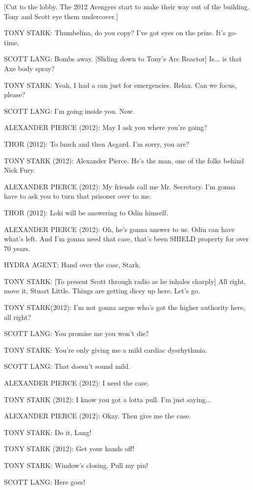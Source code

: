 [Cut to the lobby. The 2012 Avengers start to make their way out of the building. Tony and Scott eye them undercover.]

TONY STARK: Thumbelina, do you copy? I've got eyes on the prize. It's go-time.

SCOTT LANG: Bombs away. [Sliding down to Tony's Arc Reactor] Is... is that Axe body spray?

TONY STARK: Yeah, I had a can just for emergencies. Relax. Can we focus, please?

SCOTT LANG: I'm going inside you. Now.

ALEXANDER PIERCE (2012): May I ask you where you're going?

THOR (2012): To lunch and then Asgard. I'm sorry, you are?

TONY STARK (2012): Alexander Pierce. He's the man, one of the folks behind Nick Fury.

ALEXANDER PIERCE (2012): My friends call me Mr. Secretary. I'm gonna have to ask you to turn that prisoner over to me.

THOR (2012): Loki will be answering to Odin himself.

ALEXANDER PIERCE (2012): Oh, he's gonna answer to us. Odin can have what's left. And I'm gonna need that case, that's been SHIELD property for over 70 years.

HYDRA AGENT: Hand over the case, Stark.

TONY STARK: [To present Scott through radio as he inhales sharply] All right, move it, Stuart Little. Things are getting dicey up here. Let's go.

TONY STARK(2012): I'm not gonna argue who's got the higher authority here, all right?

SCOTT LANG: You promise me you won't die?

TONY STARK: You're only giving me a mild cardiac dysrhythmia.

SCOTT LANG: That doesn't sound mild.

ALEXANDER PIERCE (2012): I need the case.

TONY STARK (2012): I know you got a lotta pull. I'm just saying...

ALEXANDER PIERCE (2012): Okay. Then give me the case.

TONY STARK: Do it, Lang!

TONY STARK (2012): Get your hands off!

TONY STARK: Window's closing. Pull my pin!

SCOTT LANG: Here goes!

